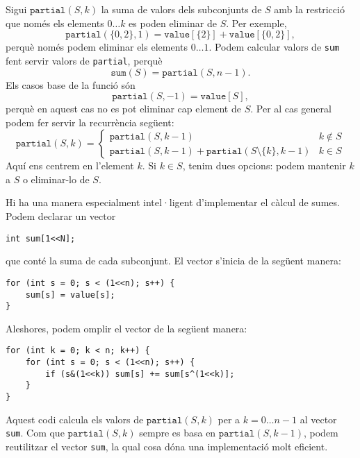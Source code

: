 Sigui $\texttt{partial}(S,k)$ la suma de valors dels subconjunts de
$S$ amb la restricció que només els elements $0 \ldots k$ es poden
eliminar de $S$. Per exemple,
\[\texttt{partial}(\{0,2\},1)=\texttt{value}[\{2\}]+\texttt{value}[\{0,2\}],\]
perquè només podem eliminar els elements $0 \ldots 1$. Podem calcular valors de \texttt{sum} fent servir valors de \texttt{partial}, perquè
\[\texttt{sum}(S) = \texttt{partial}(S,n-1).\]
Els casos base de la funció són
\[\texttt{partial}(S,-1)=\texttt{value}[S],\]
perquè en aquest cas no es pot eliminar cap element de $S$. Per al cas
general podem fer servir la recurrència següent:
\begin{equation*}
    \texttt{partial}(S,k) = \begin{cases}
               \texttt{partial}(S,k-1) & k \notin S \\
               \texttt{partial}(S,k-1) + \texttt{partial}(S \setminus \{k\},k-1) & k \in S
           \end{cases}
\end{equation*}
Aquí ens centrem en l'element $k$. Si $k \in S$, tenim dues opcions:
podem mantenir $k$ a $S$ o eliminar-lo de $S$.

Hi ha una manera especialment intel·ligent d'implementar el càlcul de
sumes. Podem declarar un vector
\begin{lstlisting}
int sum[1<<N];
\end{lstlisting}
que conté la suma de cada subconjunt. El vector s'inicia de la següent manera:
\begin{lstlisting}
for (int s = 0; s < (1<<n); s++) {
    sum[s] = value[s];
}
\end{lstlisting}
Aleshores, podem omplir el vector de la següent manera:
\begin{lstlisting}
for (int k = 0; k < n; k++) {
    for (int s = 0; s < (1<<n); s++) {
        if (s&(1<<k)) sum[s] += sum[s^(1<<k)];
    }
}
\end{lstlisting}
Aquest codi calcula els valors de $\texttt{partial}(S,k)$ per a
$k=0 \ldots n-1$ al vector \texttt{sum}. Com que
$\texttt{partial}(S,k)$ sempre es basa en $\texttt{partial}(S,k-1)$,
podem reutilitzar el vector \texttt{sum}, la qual cosa dóna una
implementació molt eficient.


